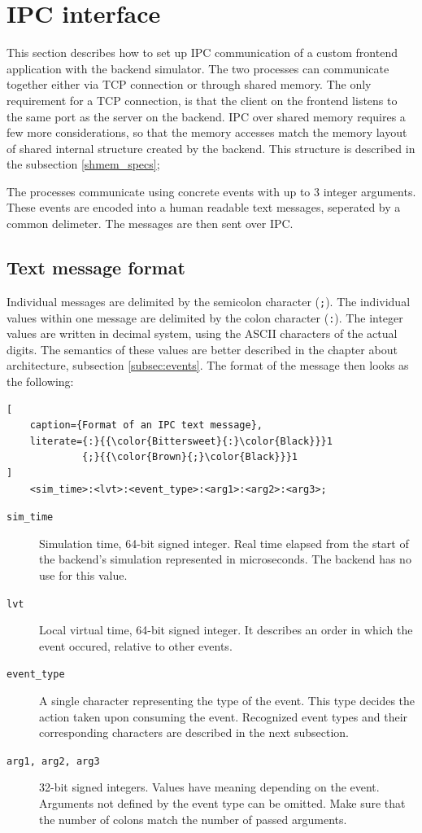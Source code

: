 \section{IPC interface}
This section describes how to set up IPC communication of a custom frontend application with the backend simulator. The two processes can communicate together either via TCP connection or through shared memory. The only requirement for a TCP connection, is that the client on the frontend listens to the same port as the server on the backend. IPC over shared memory requires a few more considerations, so that the memory accesses match the memory layout of shared internal structure created by the backend. This structure is described in the subsection \ref{shmem_specs};

The processes communicate using concrete events with up to 3 integer arguments. These events are encoded into a human readable text messages, seperated by a common delimeter. The messages are then sent over IPC.

\subsection{Text message format}
Individual messages are delimited by the semicolon character (\texttt{;}). The individual values within one message are delimited by the colon character (\texttt{:}). The integer values are written in decimal system, using the ASCII characters of the actual digits. The semantics of these values are better described in the chapter about architecture, subsection \ref{subsec:events}. The format of the message then looks as the following:

\begin{lstlisting}[
    caption={Format of an IPC text message},
    literate={:}{{\color{Bittersweet}{:}\color{Black}}}1
             {;}{{\color{Brown}{;}\color{Black}}}1
]
    <sim_time>:<lvt>:<event_type>:<arg1>:<arg2>:<arg3>;
\end{lstlisting}

\begin{description}
    \item[\texttt{sim\_time}] Simulation time, 64-bit signed integer. Real time elapsed from the start of the backend's simulation represented in microseconds. The backend has no use for this value.
    \item[\texttt{lvt}] Local virtual time, 64-bit signed integer. It describes an order in which the event occured, relative to other events.
    \item[\texttt{event\_type}] A single character representing the type of the event. This type decides the action taken upon consuming the event. Recognized event types and their corresponding characters are described in the next subsection.
    \item[\texttt{arg1, arg2, arg3}] 32-bit signed integers. Values have meaning depending on the event. Arguments not defined by the event type can be omitted. Make sure that the number of colons match the number of passed arguments.
\end{description}

